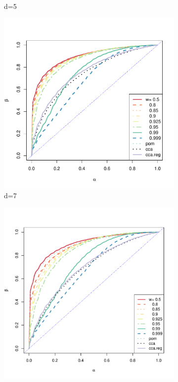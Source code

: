 \documentclass[12pt,oneside,final]{thesis}
\begin{document}
\begin{figure}
\begin{subfigure}[b]{0.5\textwidth}
                \caption{d=5}
                \label{fig:ROC-d-5}
        \end{subfigure}      
        \begin{subfigure}[b]{0.47\textwidth}             
               \includegraphics[width=\textwidth]{ROC-d-7.pdf}
                \caption{d=7}
                \label{fig:ROC-d-7}
        \end{subfigure}          
               \begin{subfigure}[b]{0.47\textwidth}
                \centering
               \includegraphics[width=\textwidth]{ROC-d-10.pdf}

\end{subfigure}
\end{figure}
\end{document}
